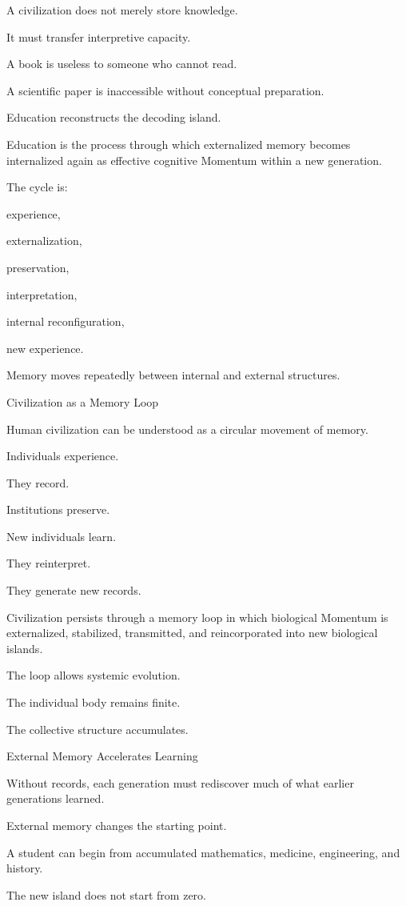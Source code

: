 A civilization does not merely store knowledge.

It must transfer interpretive capacity.

A book is useless to someone who cannot read.

A scientific paper is inaccessible without conceptual preparation.

Education reconstructs the decoding island.

Education is the process through which externalized memory becomes internalized again as effective cognitive Momentum within a new generation.

The cycle is:

experience,

externalization,

preservation,

interpretation,

internal reconfiguration,

new experience.

Memory moves repeatedly between internal and external structures.

Civilization as a Memory Loop

Human civilization can be understood as a circular movement of memory.

Individuals experience.

They record.

Institutions preserve.

New individuals learn.

They reinterpret.

They generate new records.

Civilization persists through a memory loop in which biological Momentum is externalized, stabilized, transmitted, and reincorporated into new biological islands.

The loop allows systemic evolution.

The individual body remains finite.

The collective structure accumulates.

External Memory Accelerates Learning

Without records, each generation must rediscover much of what earlier generations learned.

External memory changes the starting point.

A student can begin from accumulated mathematics, medicine, engineering, and history.

The new island does not start from zero.

